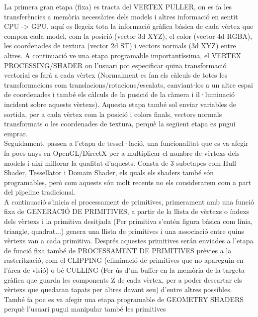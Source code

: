 \documentclass[12pt]{article}
\begin{document}
La primera gran etapa (fixa) es tracta del VERTEX PULLER, on es fa les transferències a memòria necessàries dels models i altres informació en sentit CPU -> GPU, aquí es llegeix tota la informació gràfica 
bàsica de cada vèrtex que compon cada model, com la posició (vector 3d XYZ), el color (vector 4d RGBA), les coordenades de textura (vector 2d ST) i vectors normals (3d XYZ) entre altres. A continuació 
ve una etapa programable importantíssima, el VERTEX PROCESSING/SHADER on l'usuari pot especificar quina transformació vectorial es farà a cada vèrtex (Normalment es fan els càlculs de totes les transformacions
com translacions/rotacions/escalats, canviant-los a un altre espai de coordenades i també els càlculs de la posició de la càmera i il·luminació incident sobre aquests vèrtexs). Aquesta etapa també sol enviar 
variables de sortida, per a cada vèrtex com la posició i colors finals, vectors normals transformats o les coordenades de textura, perquè la següent etapa es pugui emprar.
\\

Seguidament, passen a l'etapa de tessel·lació, una funcionalitat que es va afegir fa pocs anys en OpenGL/DirectX per a multiplicar el nombre de vèrtexs dels models i així millorar la qualitat d'aquests. 
Consta de 3 subetapes com Hull Shader, Tessellator i Domain Shader, els quals els shaders també són programables, però com aquests són molt recents no els considerarem com a part del pipeline tradicional.
\\

A continuació s'inicia el processament de primitives, primerament amb una funció fixa de GENERACIÓ DE PRIMITIVES, a partir de la llista de vèrtexs o índexs dels vèrtexs i la primitiva desitjada
(Per primitiva s'entén figura bàsica com línia, triangle, quadrat...) genera una llista de primitives i una associació entre quins vèrtexs van a cada primitiva. Després aquestes primitives serán 
enviades a l'etapa de funció fixa també de PROCESSAMENT DE PRIMITIVES prèvies a la rasterització, com el CLIPPING (eliminació de primitives que no apareguin en l'àrea de visió) o bé CULLING
(Fer ús d'un buffer en la memòria de la targeta gràfica que guarda les components Z de cada vèrtex, per a poder descartar els vèrtexs que quedaran tapats per altres davant seu) d'entre altres possibles.
També fa poc es va afegir una etapa programable de GEOMETRY SHADERS perquè l'usuari pugui manipular també les primitives
\\
\end{document}

